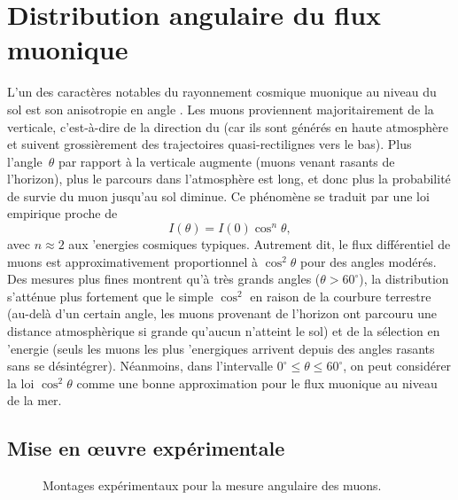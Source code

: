 \documentclass[a4paper,12pt,twoside]{article}
\begin{document}
\section{Distribution angulaire du flux muonique}
L'un des caract\`eres notables du rayonnement cosmique muonique au niveau du sol est son anisotropie en angle . Les muons proviennent majoritairement de la verticale, c'est-\`a-dire de la direction du  (car ils sont g\'en\'er\'es en haute atmosph\`ere et suivent grossi\`erement des trajectoires quasi-rectilignes vers le bas). Plus l'angle~$\theta$ par rapport \`a la verticale augmente (muons venant rasants de l'horizon), plus le parcours dans l'atmosph\`ere est long, et donc plus la probabilit\'e de survie du muon jusqu'au sol diminue. Ce ph\'enom\`ene se traduit par une loi empirique proche de
\[
  I(\theta) = I(0)\cos^n\theta,
\]
avec $n \approx 2$ aux 'energies cosmiques typiques. Autrement dit, le flux diff\'erentiel de muons est approximativement proportionnel \`a $\cos^2\theta$ pour des angles mod\'er\'es. Des mesures plus fines montrent qu'\`a tr\`es grands angles ($\theta > 60^\circ$), la distribution s'att\'enue plus fortement que le simple $\cos^2$ en raison de la courbure terrestre (au-del\`a d'un certain angle, les muons provenant de l'horizon ont parcouru une distance atmosph\`erique si grande qu'aucun n'atteint le sol) et de la s\'election en 'energie (seuls les muons les plus 'energiques arrivent depuis des angles rasants sans se d\'esint\'egrer). N\'eanmoins, dans l'intervalle $0^\circ \le \theta \leq 60^\circ$, on peut consid\'erer la loi $\cos^2\theta$ comme une bonne approximation pour le flux muonique au niveau de la mer.

\subsection{Mise en œuvre expérimentale}

\begin{figure}[H]
  \begin{minipage}{0.3\textwidth}
    \centering
    
    \caption{Montage de mesure de l'angle nul.\\Les trois scintillateurs sont alignés, comme depuis le début du TREX.}
    \label{fig:angle_nul}
  \end{minipage}
  \hfill
  \begin{minipage}
  {0.3\textwidth}
    \centering
    
    \caption{Montage de mesure pour un angle non nul.\\Les trois scintillateurs sont déplacés horizontalement pour sélectionner les muons incidents.}
    \label{fig:angle_non_nul}
  \end{minipage}
  \hfill
  \begin{minipage}{0.3\textwidth}
    \centering
    
    \caption{Effet de la largeur des scintillateurs sur la pureté angulaire. On voit que la largeur réelle des scintillateurs ne permet pas une sélection très pure des angles.}
    \label{fig:range_des_angles}
  \end{minipage}
  \caption{Montages expérimentaux pour la mesure angulaire des muons.}
\end{figure}
\end{document}
